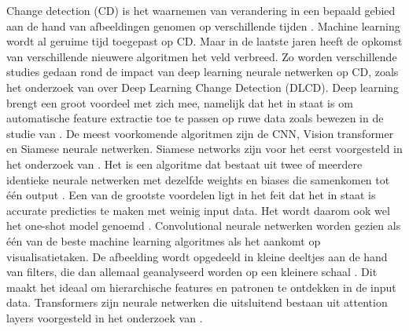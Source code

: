 


Change detection (CD) is het waarnemen van verandering in een bepaald gebied aan de hand van afbeeldingen genomen op verschillende tijden 
\autocite{SINGH_1989}. Machine learning wordt al geruime tijd toegepast op CD. Maar in de laatste jaren heeft de opkomst van verschillende 
nieuwere algoritmen het veld verbreed. Zo worden verschillende studies gedaan rond de impact van deep learning neurale netwerken op CD,
zoals het onderzoek van \textcite{Bai_2022} over Deep Learning Change Detection (DLCD). Deep learning brengt een groot voordeel met zich 
mee, namelijk dat het in staat is om automatische feature extractie toe te passen op ruwe data zoals bewezen in de studie van \textcite{LeCun_2015}.
De meest voorkomende algoritmen zijn de CNN, Vision transformer en Siamese neurale netwerken. 
Siamese networks zijn voor het eerst voorgesteld in het onderzoek van \textcite{NIPS1993_288cc0ff}. Het is een algoritme dat bestaat uit
twee of meerdere identieke neurale netwerken met dezelfde weights en biases die samenkomen tot één output \autocite{Serrano_2023}. 
Een van de grootste voordelen ligt in het feit dat het in staat is accurate predicties te maken met weinig input data. 
Het wordt daarom ook wel het one-shot model genoemd \autocite{koch2015siamese}. 
Convolutional neurale netwerken worden gezien als één van de beste machine learning algoritmes als het aankomt op visualisatietaken. De afbeelding wordt opgedeeld 
in kleine deeltjes aan de hand van filters, die dan allemaal geanalyseerd worden op een kleinere schaal \autocite{Geron2022}. Dit maakt het ideaal om hierarchische 
features en patronen te ontdekken in de input data.
Transformers zijn neurale netwerken die uitsluitend bestaan uit attention layers voorgesteld in het onderzoek van \textcite{Vaswani2017}.
